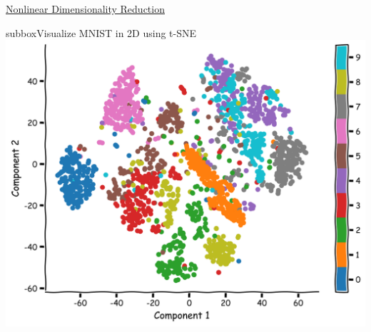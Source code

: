 \begin{textbox}{\href{https://compneuro.neuromatch.io/tutorials/W1D4_DimensionalityReduction/student/W1D4_Tutorial4.html}{ Nonlinear Dimensionality Reduction } }
\begin{subbox}{subbox}{Visualize MNIST in 2D using t-SNE}
\centering
\includegraphics[scale=0.15]{Figures/DM/DMFigure6.png}

\end{subbox}

\end{textbox}